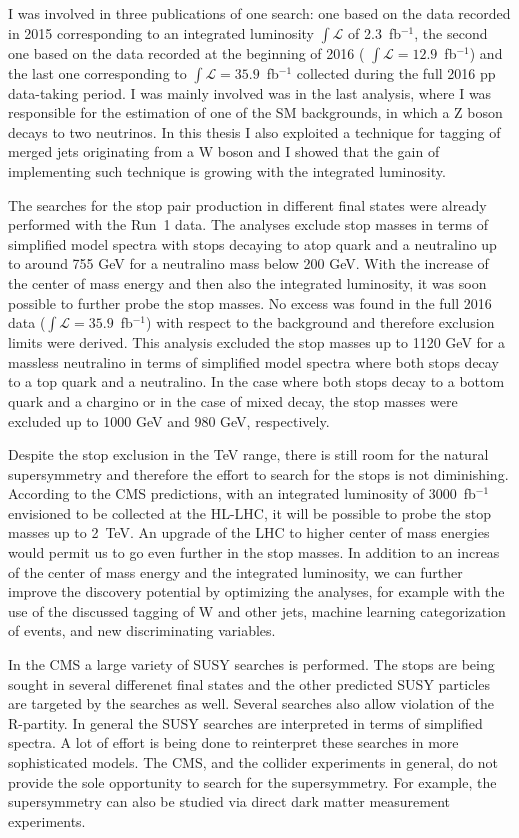 I was involved in three publications of one search: one based on the data recorded in 2015 corresponding to an integrated luminosity $\int \mathcal{L}$ of 2.3~fb$^{-1}$, the second one based on the data recorded at the beginning of 2016 ( $\int \mathcal{L}=12.9$~fb$^{-1}$) and the last one corresponding to $\int \mathcal{L}= 35.9$~fb$^{-1}$ collected during the full 2016 pp data-taking period. I was mainly involved was in the last analysis, where I was responsible for the estimation of one of the SM backgrounds, in which a Z boson decays to two neutrinos. In this thesis I also exploited a technique for tagging of merged jets originating from a W boson and I showed that the gain of implementing such technique is growing with the integrated luminosity. 

The searches for the stop pair production in different final states were already performed with the Run~1 data. The analyses exclude stop masses in terms of simplified model spectra with stops decaying to  atop quark and a neutralino up to around 755 GeV for a neutralino mass below 200 GeV. With the increase of the center of mass energy and then also the integrated luminosity, it was soon possible to further probe the stop masses. No excess was found in the full 2016 data ($\int \mathcal{L}=35.9$~fb$^{-1}$) with respect to the background and therefore exclusion limits were derived. This analysis excluded the stop masses up to 1120 GeV for a massless neutralino in terms of simplified model spectra where both stops decay to a top quark and a neutralino. In the case where both stops decay to a bottom quark and a chargino or in the case of mixed decay, the stop masses were excluded up to 1000 GeV  and 980 GeV, respectively.

Despite the stop exclusion in the TeV range, there is still room for the natural supersymmetry and therefore the effort to search for the stops is not diminishing. According to the CMS predictions, with an integrated luminosity of 3000~fb$^{-1}$ envisioned to be collected at the HL-LHC, it will be possible to probe the stop masses up to 2~TeV. An upgrade of the LHC to higher center of mass energies would permit us to go even further in the stop masses. In addition to an increas of the center of mass energy and the integrated luminosity, we can further improve the discovery potential by optimizing the analyses, for example with the use of the discussed tagging of W and other jets, machine learning categorization of events, and new discriminating variables.

In the CMS a large variety of SUSY searches is performed. The stops are being sought in several differenet final states and the other predicted SUSY particles are targeted by the searches as well. Several searches also allow violation of the R-partity. In general the SUSY searches are interpreted in terms of simplified spectra. A lot of effort is being done to reinterpret these searches in more sophisticated models. The CMS, and the collider experiments in general, do not provide the sole opportunity to search for the supersymmetry. For example, the supersymmetry can also be studied via direct dark matter measurement experiments.


